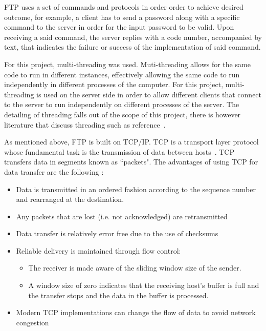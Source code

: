 \documentclass[journal, a4paper]{IEEEtran}
\begin{document}
FTP uses a set of commands and protocols in order order to achieve desired outcome, for example, a client has to send a password along with a specific command to the server in order for the input password to be valid. Upon receiving a said command, the server replies with a code number, accompanied by text, that indicates the failure or success of the implementation of said command. 


For this project, multi-threading was used. Muti-threading allows for the same code to run in different instances, effectively allowing the same code to run independently in different processes of the computer. For this project, multi-threading is used on the server side in order to allow different clients that connect to the server to run independently on different processes of the server. The detailing of threading falls out of the scope of this project, there is however literature that discuss threading such as reference~\cite{fop}.


As mentioned above, FTP is built on TCP/IP. TCP is a transport layer protocol whose fundamental task is the transmission of data between hosts~\cite{cn,mg}. TCP transfers data in segments known as ``packets". The advantages of using TCP for data transfer are the following \cite{tcpip}:

\begin{itemize}
\item Data is transmitted in an ordered fashion according to the sequence number and rearranged at the destination.
\item Any packets that are lost (i.e. not acknowledged) are retransmitted
\item Data transfer is relatively error free due to the use of checksums
\item Reliable delivery is maintained through flow control:
	\begin{itemize}
		\item The receiver is made aware of the sliding window size of the sender.
		\item A window size of zero indicates that the receiving host's buffer is full and the transfer stops and the data in the buffer is processed.
	\end{itemize}
\item Modern TCP implementations can change the flow of data to avoid network congestion
\end{itemize}
\end{document}
